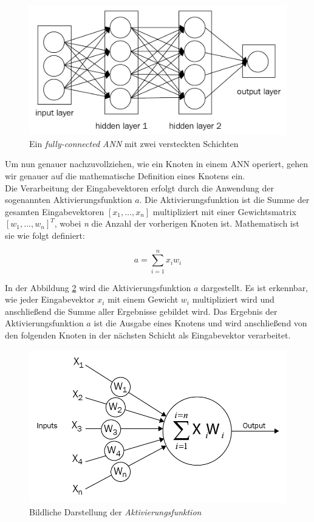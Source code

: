 \begin{figure}[H]
	\centering
	\includegraphics[width=\imgMed]{images/theory/neural_network.png}
	\caption{Ein \textit{fully-connected ANN} mit zwei versteckten Schichten \cite{Sewak2018}} 
	\label{fig:ful_con_ann}
\end{figure}

Um nun genauer nachzuvollziehen, wie ein Knoten in einem ANN operiert, gehen wir genauer auf die mathematische Definition eines Knotens ein. \\    
Die Verarbeitung der Eingabevektoren erfolgt durch die Anwendung der sogenannten Aktivierungsfunktion $a$. Die Aktivierungsfunktion ist die Summe der gesamten Eingabevektoren $[x_1,…,x_n]$ multipliziert mit einer Gewichtsmatrix $[w_1,...,w_n]^T$,
wobei \textit{n} die Anzahl der vorherigen Knoten ist. Mathematisch ist sie wie folgt definiert:

\[a = \sum_{i=1}^{n} x_i w_i\]

In der Abbildung \ref{fig:act_fun} wird die Aktivierungsfunktion $a$ dargestellt. Es ist erkennbar, wie jeder Eingabevektor $x_i$ mit einem Gewicht $w_i$ multipliziert wird und anschließend die Summe aller Ergebnisse gebildet wird. Das Ergebnis der Aktivierungsfunktion $a$ ist die Ausgabe eines Knotens und wird anschließend von den folgenden Knoten in der nächsten Schicht als Eingabevektor verarbeitet. 

\begin{figure}[H]
	\centering
	\includegraphics[width=\imgMed]{images/theory/activationfunction.png}
	\caption{Bildliche Darstellung der \textit{Aktivierungsfunktion} \cite{Sewak2018}} 
	\label{fig:act_fun}
\end{figure}


